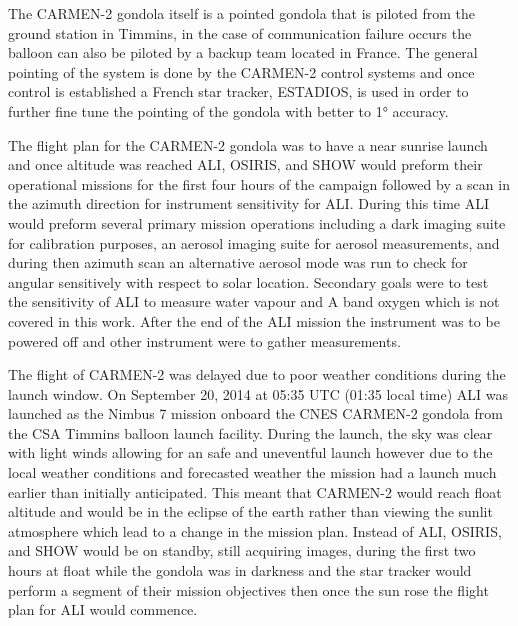 The CARMEN-2 gondola itself is a pointed gondola that is piloted from the ground station in Timmins, in the case of communication failure occurs the balloon can also be piloted by a backup team located in France. The general pointing of the system is done by the CARMEN-2 control systems and once control is established a French star tracker, ESTADIOS, is used in order to further fine tune the pointing of the gondola with better to 1\si{\degree} accuracy.

The flight plan for the CARMEN-2 gondola was to have a near sunrise launch and once altitude was reached ALI, OSIRIS, and SHOW would preform their operational missions for the first four hours of the campaign followed by a scan in the azimuth direction for instrument sensitivity for ALI. During this time ALI would preform several primary mission operations including a dark imaging suite for calibration purposes, an aerosol imaging suite for aerosol measurements, and during then azimuth scan an alternative aerosol mode was run to check for angular sensitively with respect to solar location. Secondary goals were to test the sensitivity of ALI to measure water vapour and A band oxygen which is not covered in this work. After the end of the ALI mission the instrument was to be powered off and other instrument were to gather measurements.

The flight of CARMEN-2 was delayed due to poor weather conditions during the launch window. On September 20, 2014 at 05:35 UTC (01:35 local time) ALI was launched as the Nimbus 7 mission onboard the CNES CARMEN-2 gondola from the CSA Timmins balloon launch facility. During the launch, the sky was clear with light winds allowing for an safe and uneventful launch however due to the local weather conditions and forecasted weather the mission had a launch much earlier than initially anticipated. This meant that CARMEN-2 would reach float altitude and would be in the eclipse of the earth rather than viewing the sunlit atmosphere which lead to a change in the mission plan. Instead of ALI, OSIRIS, and SHOW would be on standby, still acquiring images,  during the first two hours at float while the gondola was in darkness and the star tracker would perform a segment of their mission objectives then once the sun rose the flight plan for ALI would commence.

